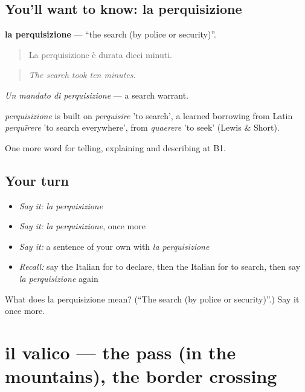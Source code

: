 \subsection*{You'll want to know: la perquisizione}
\textbf{la perquisizione} — \textquotedblleft{}the search (by police or security)\textquotedblright{}.

\begin{quote}
La perquisizione è durata dieci minuti.
\end{quote}

\begin{quote}
\emph{The search took ten minutes.}
\end{quote}

\emph{Un mandato di perquisizione} — a search warrant.

\begin{cousinweb}
\emph{perquisizione} is built on \emph{perquisire} 'to search', a learned borrowing from Latin \emph{perquīrere} 'to search everywhere', from \emph{quaerere} 'to seek' (Lewis \& Short).
\end{cousinweb}

\begin{grammarlens}[title={What you've built}]
One more word for telling, explaining and describing at B1.
\end{grammarlens}

\subsection*{Your turn}
\begin{itemize}
\raggedright
  \item \emph{Say it:} \emph{la perquisizione}
  \item \emph{Say it:} \emph{la perquisizione}, once more
  \item \emph{Say it:} a sentence of your own with \emph{la perquisizione}
  \item \emph{Recall:} say the Italian for to declare, then the Italian for to search, then say \emph{la perquisizione} again
\end{itemize}

\begin{tcolorbox}[breakable,colback=teal!4,colframe=teal!35!black,title={Before you move on}]
What does la perquisizione mean? (\textquotedblleft{}The search (by police or security)\textquotedblright{}.) Say it once more.
\end{tcolorbox}
\section[il valico]{il valico — the pass (in the mountains), the border crossing}

